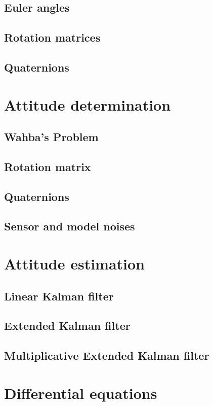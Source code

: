 \documentclass{article}
\begin{document}
\subsection{Euler angles}
\subsection{Rotation matrices}
\subsection{Quaternions}

\section{Attitude determination}
\subsection{Wahba's Problem}
\subsection{Rotation matrix}
\subsection{Quaternions}
\subsection{Sensor and model noises}

\section{Attitude estimation}
\subsection{Linear Kalman filter}
\subsection{Extended Kalman filter}
\subsection{Multiplicative Extended Kalman filter}

\newpage
\appendix
\section{Differential equations}
\end{document}
